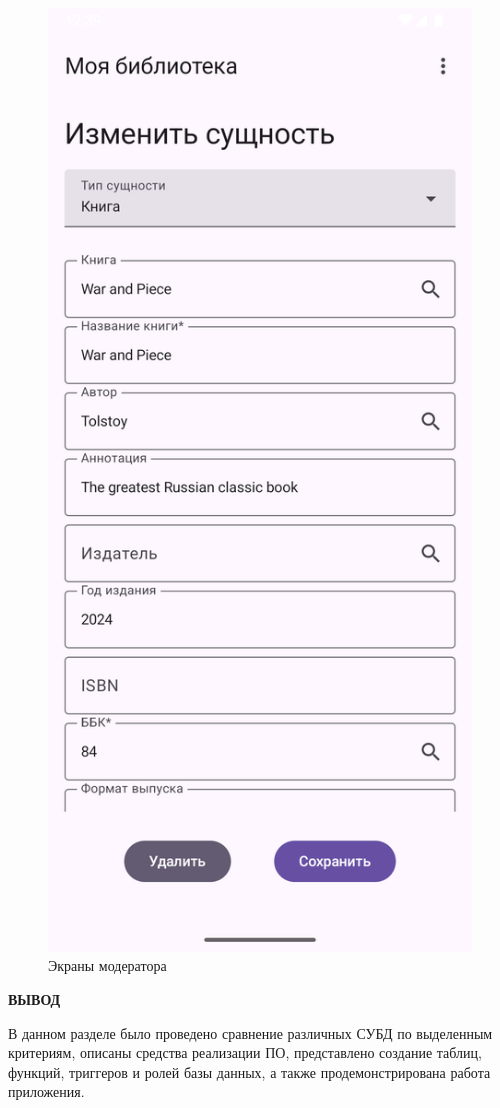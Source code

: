 \begin{figure}[H]
	\includegraphics[scale=0.125]{img/book_edit_2.png}
	\caption{Экраны модератора}
	\label{fig:moderator}
\end{figure}

\clearpage

\textbf{ВЫВОД}

В данном разделе было проведено сравнение различных СУБД по выделенным критериям, описаны средства реализации ПО, представлено создание таблиц, функций, триггеров и ролей базы данных, а также продемонстрирована работа приложения.


\clearpage
